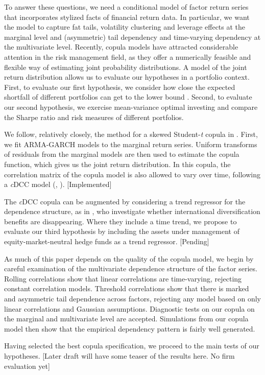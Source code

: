 To answer these questions, we need a conditional model of factor return series that incorporates stylized facts of financial return data. In particular, we want the model to capture fat tails, volatility clustering and leverage effects at the marginal level and (asymmetric) tail dependency and time-varying dependency at the multivariate level. Recently, copula models have attracted considerable attention in the risk management field, as they offer a numerically feasible and flexible way of estimating joint probability distributions. A model of the joint return distribution allows us to evaluate our hypotheses in a portfolio context. First, to evaluate our first hypothesis, we consider how close the expected shortfall of different portfolios can get to the lower bound \autocite{ChristoffersenErrunzaJacobLanglois2012}. Second, to evaluate our second hypothesis, we exercise mean-variance optimal investing and compare the Sharpe ratio and risk measures of different portfolios.

We follow, relatively closely, the method for a skewed Student-\textit{t} copula in \textcite{ChristoffersenLanglois2013}. First, we fit ARMA-GARCH models to the marginal return series. Uniform transforms of residuals from the marginal models are then used to estimate the copula function, which gives us the joint return distribution. In this copula, the correlation matrix of the copula model is also allowed to vary over time, following a \textit{c}DCC model (\textcite{Engle2002}, \textcite{Aielli2013}). [Implemented]

The \textit{c}DCC copula can be augmented by considering a trend regressor for the dependence structure, as in \textcite{ChristoffersenErrunzaJacobLanglois2012}, who investigate whether international diversification benefits are disappearing. Where they include a time trend, we propose to evaluate our third hypothesis by including the assets under management of equity-market-neutral hedge funds as a trend regressor. [Pending]

As much of this paper depends on the quality of the copula model, we begin by careful examination of the multivariate dependence structure of the factor series. Rolling correlations show that linear correlations are time-varying, rejecting constant correlation models. Threshold correlations show that there is marked and asymmetric tail dependence across factors, rejecting any model based on only linear correlations and Gaussian assumptions. Diagnostic tests on our copula on the marginal and multivariate level are accepted. Simulations from our copula model then show that the empirical dependency pattern is fairly well generated. 

Having selected the best copula specification, we proceed to the main tests of our hypotheses. [Later draft will have some teaser of the results here. No firm evaluation yet]